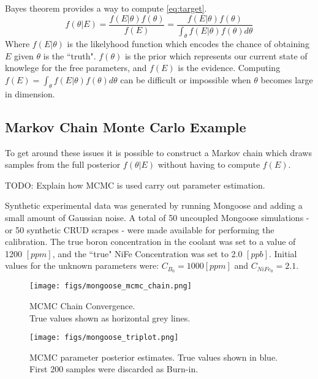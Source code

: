 \documentclass[10pt,a4paper]{report}
\begin{document}
Bayes theorem provides a way to compute \ref{eq:target}.
\begin{equation}
f(\theta| E) = \frac{f(E|\theta)f(\theta)}{f(E)} = \frac{f(E|\theta)f(\theta)}{\int_\theta f(E|\theta) f(\theta)d\theta}
\end{equation}
Where $f(E|\theta)$ is the likelyhood function which encodes the chance of obtaining $E$ given $\theta$ is the ``truth". $f(\theta)$ is the prior which represents our current state of knowlege for the free parameters, and $f(E)$ is the evidence.
Computing $f(E)= \int_\theta f(E|\theta) f(\theta)d\theta$ can be difficult or impossible when $\theta$ becomes large in dimension.

\subsection{Markov Chain Monte Carlo Example}

To get around these issues it is possible to construct a Markov chain which draws samples from the full posterior $f(\theta|E)$ without having to compute $f(E)$.

TODO: Explain how MCMC is used carry out parameter estimation.

Synthetic experimental data was generated by running Mongoose and adding a small amount of Gaussian noise.  A total of 50 uncoupled Mongoose simulations - or 50 synthetic CRUD scrapes - were made available for performing the calibration.  The true boron concentration in the coolant was set to a value of 1200 $[ppm]$, and the ``true" NiFe Concentration was set to 2.0 $[ppb]$. Initial values for the unknown parameters were: $C_{B_0} = 1000 [ppm]$ and $C_{NiFe_0} = 2.1$.

\begin{figure}
    \centering
    \begin{minipage}{.5\textwidth}
        \centering
        \texttt{[image: figs/mongoose\_mcmc\_chain.png]}
        \caption{MCMC Chain Convergence.  \\
            True values
        shown as horizontal grey lines. \label{fig:mg_chain}}
    \end{minipage}%
    \begin{minipage}{.5\textwidth}
        \centering
        \texttt{[image: figs/mongoose\_triplot.png]}
        \caption{MCMC parameter posterior estimates. True values shown in blue. First 200 samples were discarded as Burn-in.}
    \end{minipage}
\end{figure}
\end{document}
